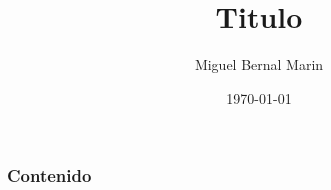 \documentclass[aspectratio=169]{beamer}
\title{Titulo} %
\author{Miguel Bernal Marin} %
\institute[Escuela] %
{
 Nombre de la Institución\\%
\medskip
\textit{correo} %
}
\date{
    \today
} %
\begin{document}
\begin{frame}
    \titlepage
\end{frame}

\begin{frame}
    \frametitle{Contenido}
    \tableofcontents
\end{frame}


\end{document}
